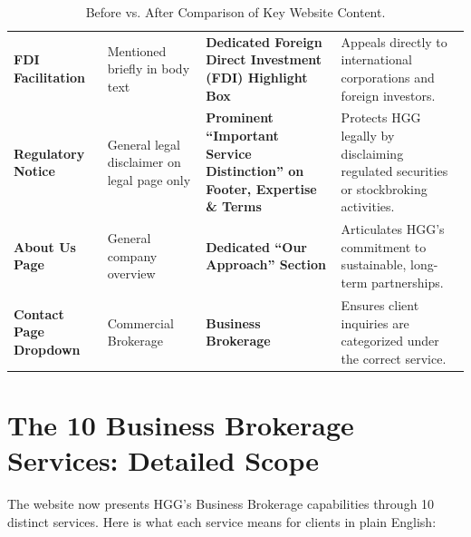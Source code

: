 \documentclass[11pt,a4paper]{article}
\begin{document}
\begin{table}[H]
\begin{tabularx}{\textwidth}{>{\raggedright\arraybackslash}p{3.0cm} >{\raggedright\arraybackslash}p{4.0cm} >{\raggedright\arraybackslash}p{4.4cm} >{\raggedright\arraybackslash}X}
\addlinespace
\textbf{FDI Facilitation} & Mentioned briefly in body text & \textbf{Dedicated Foreign Direct Investment (FDI) Highlight Box} & Appeals directly to international corporations and foreign investors. \\
\addlinespace
\textbf{Regulatory Notice} & General legal disclaimer on legal page only & \textbf{Prominent ``Important Service Distinction'' on Footer, Expertise \& Terms} & Protects HGG legally by disclaiming regulated securities or stockbroking activities. \\
\addlinespace
\textbf{About Us Page} & General company overview & \textbf{Dedicated ``Our Approach'' Section} & Articulates HGG's commitment to sustainable, long-term partnerships. \\
\addlinespace
\textbf{Contact Page Dropdown} & Commercial Brokerage & \textbf{Business Brokerage} & Ensures client inquiries are categorized under the correct service. \\
\bottomrule
\end{tabularx}
\caption{Before vs. After Comparison of Key Website Content.}
\end{table}

\vspace{0.2cm}

\section{The 10 Business Brokerage Services: Detailed Scope}

The website now presents HGG's Business Brokerage capabilities through 10 distinct services. Here is what each service means for clients in plain English:
\end{document}

